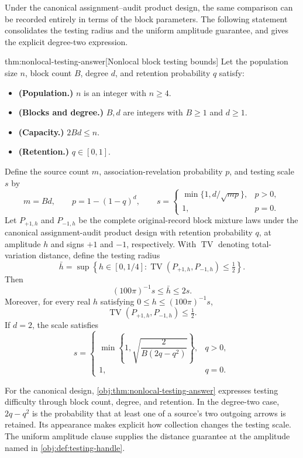 Under the canonical assignment--audit product design, the same comparison can be recorded entirely in terms of the block parameters. The following statement consolidates the testing radius and the uniform amplitude guarantee, and gives the explicit degree-two expression.

\begin{theoremv}{thm:nonlocal-testing-answer}[Nonlocal block testing bounds]
Let the population size \(n\), block count \(B\), degree \(d\), and retention probability \(q\) satisfy:
\begin{itemize}
\item \textbf{(Population.)} \(n\) is an integer with \(n\ge4\).
\item \textbf{(Blocks and degree.)} \(B,d\) are integers with \(B\ge1\) and \(d\ge1\).
\item \textbf{(Capacity.)} \(2Bd\le n\).
\item \textbf{(Retention.)} \(q\in[0,1]\).
\end{itemize}
Define the source count \(m\), association-revelation probability \(p\), and testing scale \(s\) by
\[
m=Bd,\qquad p=1-(1-q)^d,\qquad
s=
\begin{cases}
\min\{1,d/\sqrt{mp}\},&p>0,\\
1,&p=0.
\end{cases}
\]
Let \(P_{+1,h}\) and \(P_{-1,h}\) be the complete original-record block mixture laws under the canonical assignment-audit product design with retention probability \(q\), at amplitude \(h\) and signs \(+1\) and \(-1\), respectively. With \(\operatorname{TV}\) denoting total-variation distance, define the testing radius
\[
\bar h
=\sup\left\{h\in[0,1/4]:
\operatorname{TV}(P_{+1,h},P_{-1,h})\le\tfrac12\right\}.
\]
Then
\[
(100\pi)^{-1}s\le\bar h\le2s.
\]
Moreover, for every real \(h\) satisfying \(0\le h\le(100\pi)^{-1}s\),
\[
\operatorname{TV}(P_{+1,h},P_{-1,h})\le\tfrac12.
\]
If \(d=2\), the scale satisfies
\[
s=
\begin{cases}
\min\left\{1,\sqrt{\dfrac{2}{B(2q-q^2)}}\right\},&q>0,\\
1,&q=0.
\end{cases}
\]
\end{theoremv}

For the canonical design, \cref{obj:thm:nonlocal-testing-answer} expresses testing difficulty through block count, degree, and retention. In the degree-two case, \(2q-q^2\) is the probability that at least one of a source's two outgoing arrows is retained. Its appearance makes explicit how collection changes the testing scale. The uniform amplitude clause supplies the distance guarantee at the amplitude named in \cref{obj:def:testing-handle}.

